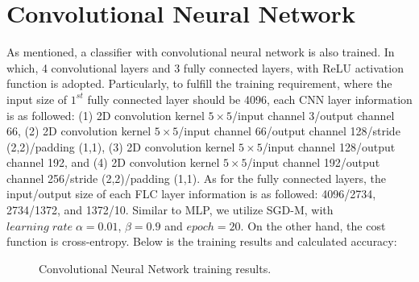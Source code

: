 \documentclass[a4paper,12pt]{article}
\begin{document}
\section*{Convolutional Neural Network}
\vspace*{-0.4cm}
As mentioned, a classifier with convolutional neural network is also trained.
In which, 4 convolutional layers and 3 fully connected layers, with ReLU activation function
is adopted. Particularly, to fulfill the training requirement, where the input size 
of $1^{st}$ fully connected layer should be 4096, each CNN layer information is as followed:
(1) 2D convolution kernel $5 \times 5$/input channel 3/output channel 66,
(2) 2D convolution kernel $5 \times 5$/input channel 66/output channel 128/stride (2,2)/padding (1,1),
(3) 2D convolution kernel $5 \times 5$/input channel 128/output channel 192,
and
(4) 2D convolution kernel $5 \times 5$/input channel 192/output channel 256/stride (2,2)/padding (1,1).
As for the fully connected layers, the input/output size of each FLC layer information 
is as followed: 4096/2734, 2734/1372, and 1372/10.
Similar to MLP, we utilize SGD-M, with $learning \; rate \; \alpha=0.01$, 
$\beta=0.9$ and $epoch=20$.
On the other hand, the cost function is cross-entropy.
Below is the training results and calculated accuracy:

\begin{figure}[!htb]
   \captionsetup[subfigure]{justification=centering}
   \centering
   \hspace{0.5cm}%
   \caption{Convolutional Neural Network training results.}
\end{figure}
\vspace*{-0.6cm}
\end{document}
